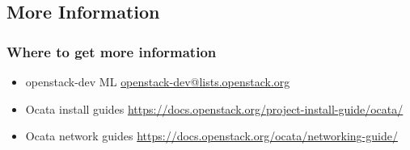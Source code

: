 \documentclass[aspectratio=169,11pt,hyperref={colorlinks=true}]{beamer}
\begin{document}
\subsection{More Information}
\begin{frame}
\frametitle{Where to get more information}
    \begin{itemize}
        \item openstack-dev ML\: \href{mailto:openstack-dev@lists.openstack.org}{openstack-dev@lists.openstack.org}
        \item Ocata install guides\: \href{https://docs.openstack.org/project-install-guide/ocata/}{https://docs.openstack.org/project-install-guide/ocata/}
        \item Ocata network guides\: \href{https://docs.openstack.org/ocata/networking-guide/}{https://docs.openstack.org/ocata/networking-guide/}
   \end{itemize}
\end{frame}
\end{document}
